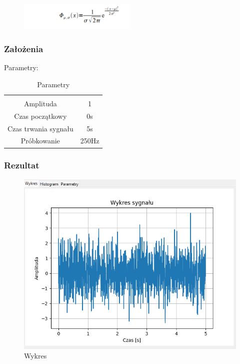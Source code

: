\documentclass{article}
\begin{document}
        \begin{figure}[!htbp]
            \centering
            \includegraphics[width=0.5\textwidth]{img/szumgauss.png}
        \end{figure}
        \subsubsection{Założenia}
        \noindent
        Parametry:
        \begin{table}[h!]
            \centering
            \vspace{0.2cm}
            \begin{tabular}{|c|c|}
                \hline\hline\\[-0.4cm]
                Amplituda & 1  \\
                \hline
                Czas początkowy & 0s  \\
                \hline
                Czas trwania sygnału & 5s  \\
                \hline
                Próbkowanie & 250Hz \\
                \hline
            \end{tabular}
            \caption{Parametry}
            \label{szumgaussowski}
        \end{table}
    \subsubsection{Rezultat}
        \begin{figure}[h!]
            \centering
            \includegraphics[width=\textwidth]{img/szum-gauss/wykres.png}
            \caption{Wykres}
        \end{figure}
\end{document}
